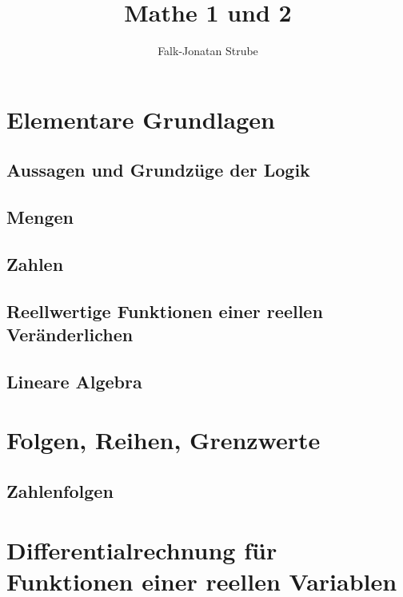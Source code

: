 \documentclass{scrreprt}
\title{Mathe 1 und 2}
\author{Falk-Jonatan Strube}
\begin{document}
\maketitle
\tableofcontents\clearpage

\chapter{Elementare Grundlagen}

\section{Aussagen und Grundzüge der Logik}


\section{Mengen}\label{sec:Mengen}


\section{Zahlen}


\section{Reellwertige Funktionen einer reellen Veränderlichen}


\section{Lineare Algebra}


\chapter{Folgen, Reihen, Grenzwerte}
\section{Zahlenfolgen}



\chapter{Differentialrechnung für Funktionen einer reellen Variablen}

\end{document}
